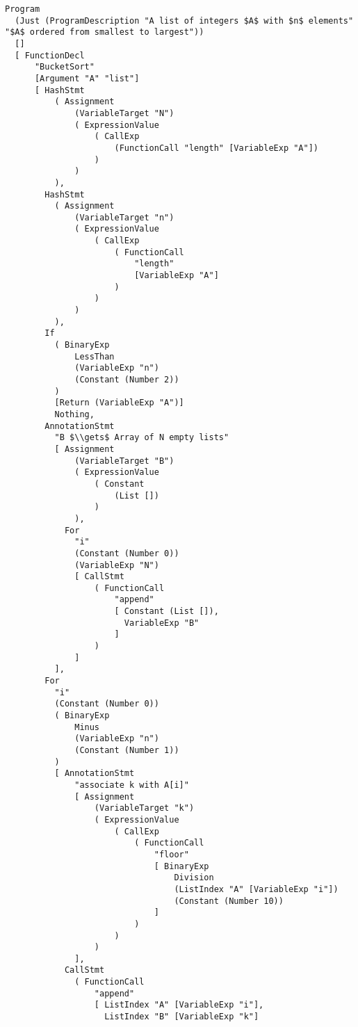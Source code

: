 \begin{lstlisting}
Program
  (Just (ProgramDescription "A list of integers $A$ with $n$ elements" "$A$ ordered from smallest to largest"))
  []
  [ FunctionDecl
      "BucketSort"
      [Argument "A" "list"]
      [ HashStmt
          ( Assignment
              (VariableTarget "N")
              ( ExpressionValue
                  ( CallExp
                      (FunctionCall "length" [VariableExp "A"])
                  )
              )
          ),
        HashStmt
          ( Assignment
              (VariableTarget "n")
              ( ExpressionValue
                  ( CallExp
                      ( FunctionCall
                          "length"
                          [VariableExp "A"]
                      )
                  )
              )
          ),
        If
          ( BinaryExp
              LessThan
              (VariableExp "n")
              (Constant (Number 2))
          )
          [Return (VariableExp "A")]
          Nothing,
        AnnotationStmt
          "B $\\gets$ Array of N empty lists"
          [ Assignment
              (VariableTarget "B")
              ( ExpressionValue
                  ( Constant
                      (List [])
                  )
              ),
            For
              "i"
              (Constant (Number 0))
              (VariableExp "N")
              [ CallStmt
                  ( FunctionCall
                      "append"
                      [ Constant (List []),
                        VariableExp "B"
                      ]
                  )
              ]
          ],
        For
          "i"
          (Constant (Number 0))
          ( BinaryExp
              Minus
              (VariableExp "n")
              (Constant (Number 1))
          )
          [ AnnotationStmt
              "associate k with A[i]"
              [ Assignment
                  (VariableTarget "k")
                  ( ExpressionValue
                      ( CallExp
                          ( FunctionCall
                              "floor"
                              [ BinaryExp
                                  Division
                                  (ListIndex "A" [VariableExp "i"])
                                  (Constant (Number 10))
                              ]
                          )
                      )
                  )
              ],
            CallStmt
              ( FunctionCall
                  "append"
                  [ ListIndex "A" [VariableExp "i"],
                    ListIndex "B" [VariableExp "k"]

\end{lstlisting}
